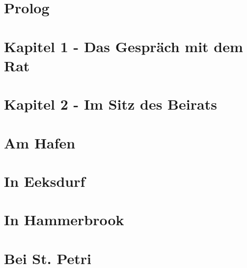 
\section{\textbf{Prolog}}


\section{\textbf{Kapitel 1 - Das Gespräch mit dem Rat}}



\section{\textbf{Kapitel 2 - Im Sitz des Beirats}}



\section{\textbf{Am Hafen}}
\label{Hafen}


\section{\textbf{In Eeksdurf}}
\label{xd}


\section{\textbf{In Hammerbrook}}
\label{arm}


\section{\textbf{Bei St. Petri}}
\label{Petri}


%
